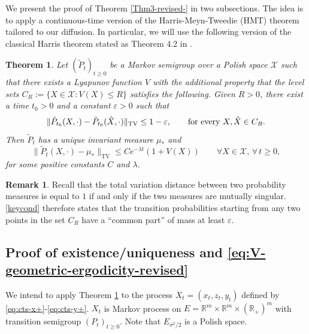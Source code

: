 \documentclass[11pt, a4paper,leqno]{amsart}
\newtheorem{theorem}{Theorem}[section]
\theoremstyle{definition}
\newtheorem{remark}{Remark}[section]
\numberwithin{equation}{section}
\newcommand{\R}{\mathbb R}
\begin{document}
We present the proof of  Theorem \ref{Thm3-revised-} in two subsections.  The idea is to apply a continuous-time version of the  Harris-Meyn-Tweedie (HMT) theorem tailored to our diffusion. In particular,  we will use the following version of the classical Harris theorem \cite{Harris1956,meyn1993foster, MeynTweedie2009,HairerMattingly2011b} stated as Theorem 4.2 in \cite{HairerMattinglyScheutzow2011}.

\begin{theorem}\label{thm:HMT-cts}
Let \( (\tilde P_t)_{t \ge 0} \) be a Markov semigroup over a Polish space \( \mathcal{X} \) such that
there exists a Lyapunov function \( V \) with the additional property that the level sets
\(C_R:=\{ X \in \mathcal{X} : V(X) \le R \}\) satisfies the following. Given \( R > 0 \), there exist a time
\( t_0> 0 \) and a constant \( \varepsilon > 0 \) such that
\begin{equation}\label{keycond}
\| \tilde  P_{t_0}(X, \cdot) - \tilde  P_{t_0}(\hat X, \cdot) \|_{\mathrm{TV}} \le 1 - \varepsilon,\qquad\mbox{for every \( X, \hat X \in C_R \).}
\end{equation}
 Then \( \tilde  P_t \) has a unique invariant measure \( \mu_* \) and
\[
\| \tilde  P_t(X, \cdot) - \mu_* \|_{\mathrm{TV}}
\le C e^{-\lambda t} (1 + V(X))\qquad\forall X\in\mathcal{X},\, \forall\, t\geq 0,
\]
for some positive constants \( C \) and \( \lambda \).
\end{theorem}


\begin{remark}
Recall that the total variation distance between two probability
measures is equal to \( 1 \) if and only if the two measures are mutually singular. \eqref{keycond} therefore states that the transition probabilities starting from any two points in the set $C_R$
have a ``common part'' of mass at least \( \varepsilon \).
\end{remark}






\subsection{Proof of existence/uniqueness and \eqref{eq:V-geometric-ergodicity-revised}} We intend to apply Theorem \ref{thm:HMT-cts} to the process $X_t=(x_t,z_t,y_t)$ defined by \eqref{eq:cts-x+}-\eqref{eq:cts-y+}.  $X_t$ is Markov process on
$E=\R^m\times\R^m\times(\R_+)^m$  with transition semigroup $(P_t)_{t\ge0}$. Note that $E_{\sigma^2/2}$ is a Polish space.
\end{document}
